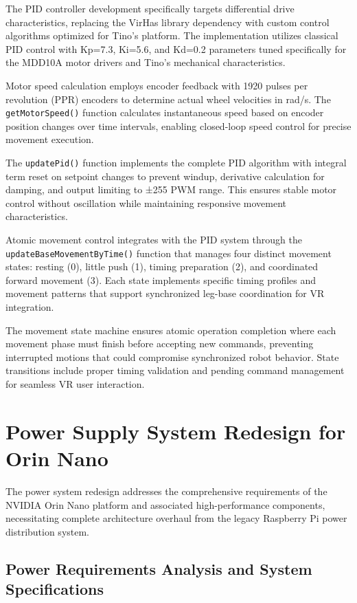 The PID controller development specifically targets differential drive characteristics, replacing the VirHas library dependency with custom control algorithms optimized for Tino's platform. The implementation utilizes classical PID control with Kp=7.3, Ki=5.6, and Kd=0.2 parameters tuned specifically for the MDD10A motor drivers and Tino's mechanical characteristics.

Motor speed calculation employs encoder feedback with 1920 pulses per revolution (PPR) encoders to determine actual wheel velocities in rad/s. The \texttt{getMotorSpeed()} function calculates instantaneous speed based on encoder position changes over time intervals, enabling closed-loop speed control for precise movement execution.

The \texttt{updatePid()} function implements the complete PID algorithm with integral term reset on setpoint changes to prevent windup, derivative calculation for damping, and output limiting to ±255 PWM range. This ensures stable motor control without oscillation while maintaining responsive movement characteristics.

Atomic movement control integrates with the PID system through the \texttt{updateBaseMovementByTime()} function that manages four distinct movement states: resting (0), little push (1), timing preparation (2), and coordinated forward movement (3). Each state implements specific timing profiles and movement patterns that support synchronized leg-base coordination for VR integration.

The movement state machine ensures atomic operation completion where each movement phase must finish before accepting new commands, preventing interrupted motions that could compromise synchronized robot behavior. State transitions include proper timing validation and pending command management for seamless VR user interaction.

\section{Power Supply System Redesign for Orin Nano}

The power system redesign addresses the comprehensive requirements of the NVIDIA Orin Nano platform and associated high-performance components, necessitating complete architecture overhaul from the legacy Raspberry Pi power distribution system.

\subsection{Power Requirements Analysis and System Specifications}

